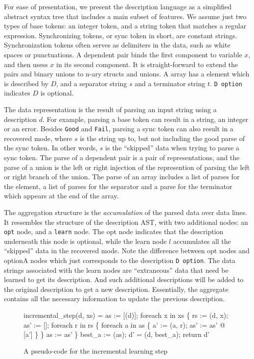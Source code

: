 For ease of presentation, we present the description language as a simplified abstract
syntax tree that includes a main subset of \pads{} features. 
We assume just two types of base tokens: 
an integer token, and a string token that matches a
regular expression. Synchronizing tokens, or sync token in short, are constant strings. 
Synchronization tokens often
serves as delimiters in the data, such as white spaces or punctuations.
A dependent pair binds
the first component to variable $x$, and then usess $x$ in its second component. It is 
straight-forward to extend the pairs and binary unions to n-ary structs and unions.
A array has a element which is described by $D$, and a separator string $s$ and a
terminator string $t$. {\tt D option} indicates $D$ is optional.

The data representation is the result of parsing an input string using a description $d$.
For example, parsing a base token can result in a string, an integer or an error.
Besides {\tt Good} and {\tt Fail}, parsing a sync token can also result in 
a recovered mode, where $s$ is the string up to, but not including the good parse of the
sync token. In other words, $s$ is the ``skipped'' data when trying to parse a sync token.
The parse of a dependent pair is a pair of representations, and the
parse of a union is the left or right injection of the represention of parsing the left or
right branch of the union. The parse of an array includes a list of parses for the element,
a list of parses for the separator and a parse for the terminator which appears at the end of
the array.

The aggregation structure is the {\em accumulation} of the parsed data over data lines.
It ressembles the structure of the description AST, with two additional nodes: 
an {\tt opt} node, and a {\tt learn} node. 
The opt node indicates that the description underneath this node is
optional, while the learn node $l$ accumulates all the ``skipped'' data in the recovered mode. Note the difference between opt nodes and optionA nodes which
just corresponds to the description {\tt D option}. 
The data strings associated with the learn nodes are ``extraneous'' data that need be learned to
get its description. And such additional descriptions will be added to the original description
to get a new description. Essentially, the aggregate contains all the necessary information
to update the previous description.

\begin{figure}[t]
\begin{codebox}
incremental_step(d, xs) =
  as := [(d)];
  foreach x in xs \{
    rs := (d, x);
    as' := [];
    foreach r in rs \{
      foreach a in as \{
        a' := (a, r); 
        as' := as' @ [a']
      \}
    \}
    as := as'
  \} 
  best_a := (as);
  d' = (d, best_a);  
  return d'
\end{codebox}
\caption{A pseudo-code for the incremental learning step}
\label{fig:inc-learning}
\end{figure}

